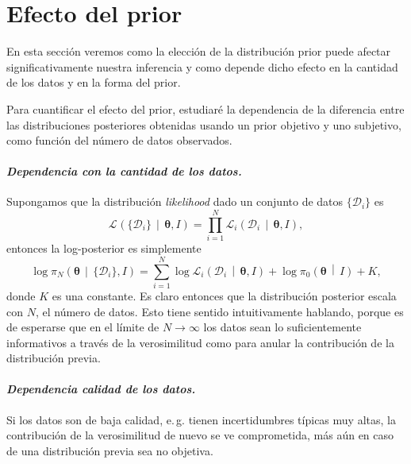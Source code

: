 \documentclass[a4paper,twoside]{article}
\newcommand{\hip}{\ensuremath{\mathbold{\theta}}\xspace}
\newcommand{\dat}{\ensuremath{\{\mathcal{D}_i\}}\xspace}
\newcommand{\pos}[2]{\ensuremath{\pi_N\left(#1\,\middle|\, #2\right)}\xspace}
\newcommand{\pri}[2]{\ensuremath{\pi_0\left(#1\,\middle|\, #2\right)}\xspace}
\newcommand{\lik}[3][]{\ensuremath{\mathcal{L}_{#1}\left(#2\,\middle|\, #3\right)}\xspace}
\begin{document}

\section{Efecto del prior}
%
En esta sección veremos como la elección de la distribución prior puede afectar significativamente
nuestra inferencia y como depende dicho efecto en la cantidad de los datos y en la forma del prior.

Para cuantificar el efecto del prior, estudiaré la dependencia de la diferencia entre las
distribuciones posteriores obtenidas usando un prior objetivo y uno subjetivo, como función del
número de datos observados.

\paragraph{\textit{\color{teal}Dependencia con la cantidad de los datos.}} Supongamos que la
distribución \emph{likelihood} dado un conjunto de datos $\dat$ es
%
$$\lik{\dat}{\hip,I} = \prod_{i=1}^N\lik[i]{\mathcal{D}_i}{\hip,I},$$
%
entonces la log-posterior es simplemente
%
$$\log{\pos{\hip}{\dat,I}} = \sum_{i=1}^N\log{\lik[i]{\mathcal{D}_i}{\hip,I}} + \log{\pri{\hip}{I}} + K,$$
%
donde $K$ es una constante. Es claro entonces que la distribución posterior escala con $N$, el
número de datos. Esto tiene sentido intuitivamente hablando, porque es de esperarse que en el límite
de $N\to\infty$ los datos sean lo suficientemente informativos a través de la verosimilitud como
para anular la contribución de la distribución previa.

\paragraph{\textit{\color{teal}Dependencia calidad de los datos.}} Si los datos son de baja calidad,
e.\,g. tienen incertidumbres típicas muy altas, la contribución de la verosimilitud de nuevo se ve
comprometida, más aún en caso de una distribución previa sea no objetiva.

\end{document}
